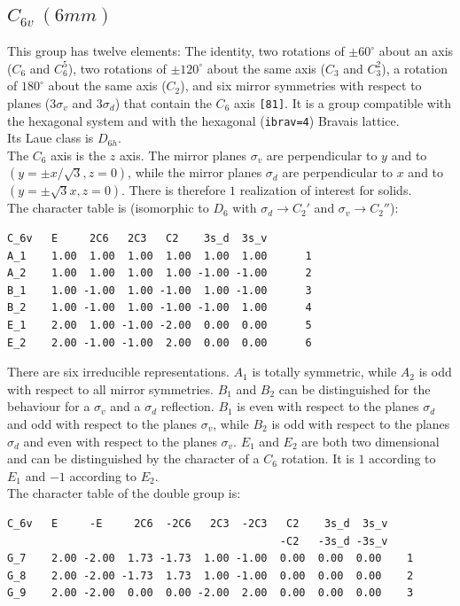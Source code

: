 \documentclass[12pt,a4paper]{article}
\begin{document}
\subsection{\color{web-blue}$C_{6v}\ (6mm)$} 
This group has twelve elements: The identity, two rotations of $\pm60^\circ$ 
about an axis ($C_6$ and $C_6^5$), two rotations of $\pm120^\circ$
about the same axis ($C_3$ and $C_3^2$), a rotation of $180^\circ$ about 
the same axis ($C_2$), and six mirror symmetries with respect to
planes ($3\sigma_v$ and $3\sigma_d$) that contain the $C_6$ axis \texttt{[81]}.
It is a group compatible with the hexagonal system and with the  
hexagonal (\texttt{ibrav=4}) Bravais lattice. \\ 
Its Laue class is $D_{6h}$. \\
The $C_6$ axis is the $z$ axis. The mirror planes $\sigma_v$ are perpendicular 
to $y$ and to $(y=\pm x/\sqrt{3}, z=0)$, while the mirror planes $\sigma_d$
are perpendicular to $x$ and to $(y=\pm \sqrt{3} x, z=0)$.
There is therefore $1$ realization of interest for solids. \\
The character table is (isomorphic to $D_6$ with $\sigma_d \rightarrow C_2'$
and $\sigma_v \rightarrow C_2''$):
\begin{verbatim}
C_6v   E     2C6   2C3   C2    3s_d  3s_v 
A_1    1.00  1.00  1.00  1.00  1.00  1.00      1
A_2    1.00  1.00  1.00  1.00 -1.00 -1.00      2
B_1    1.00 -1.00  1.00 -1.00  1.00 -1.00      3
B_2    1.00 -1.00  1.00 -1.00 -1.00  1.00      4
E_1    2.00  1.00 -1.00 -2.00  0.00  0.00      5
E_2    2.00 -1.00 -1.00  2.00  0.00  0.00      6
\end{verbatim}
There are six irreducible representations. $A_1$ is totally symmetric, while
$A_2$ is odd with respect to all mirror symmetries. $B_1$ and $B_2$ can be
distinguished for the behaviour for a $\sigma_v$ and a
$\sigma_d$ reflection. $B_1$ is even with respect to the planes $\sigma_d$
and odd with respect to the planes $\sigma_v$, while $B_2$ is odd with
respect to the planes $\sigma_d$ and even with respect to the planes 
$\sigma_v$. $E_1$ and $E_2$ are both two dimensional and can be 
distinguished by the character of a $C_6$ rotation. It is
$1$ according to $E_1$ and $-1$ according to $E_2$.\\
The character table of the double group is:
\begin{verbatim}
C_6v   E     -E     2C6  -2C6   2C3  -2C3   C2    3s_d  3s_v
                                           -C2   -3s_d -3s_v
G_7    2.00 -2.00  1.73 -1.73  1.00 -1.00  0.00  0.00  0.00    1
G_8    2.00 -2.00 -1.73  1.73  1.00 -1.00  0.00  0.00  0.00    2
G_9    2.00 -2.00  0.00  0.00 -2.00  2.00  0.00  0.00  0.00    3
\end{verbatim}
\end{document}
